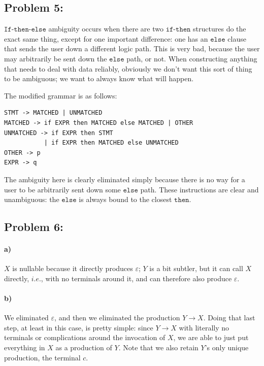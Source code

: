 \documentclass[a4paper]{article}
\begin{document}
\subsection*{Problem 5:}

$\texttt{If-then-else}$ ambiguity occurs when there are two $\texttt{if-then}$ structures do the exact same thing, except for one important difference: one has an $\texttt{else}$ clause that sends the user down a different logic path. This is very bad, because the user may arbitrarily be sent down the $\texttt{else}$ path, or not. When constructing anything that needs to deal with data reliably, obviously we don't want this sort of thing to be ambiguous; we want to always know what will happen.

The modified grammar is as follows:

\begin{verbatim}
STMT -> MATCHED | UNMATCHED
MATCHED -> if EXPR then MATCHED else MATCHED | OTHER
UNMATCHED -> if EXPR then STMT
           | if EXPR then MATCHED else UNMATCHED
OTHER -> p
EXPR -> q
\end{verbatim}

The ambiguity here is clearly eliminated simply because there is no way for a user to be arbitrarily sent down some $\texttt{else}$ path. These instructions are clear and unambiguous: the $\texttt{else}$ is always bound to the closest $\texttt{then}$.

\subsection*{Problem 6:} 

\paragraph{a)} $X$ is nullable because it directly produces $\varepsilon$; $Y$ is a bit subtler, but it can call $X$ directly, $\textit{i.e.}$, with no terminals around it, and can therefore also produce $\varepsilon$.

\paragraph{b)} We eliminated $\varepsilon$, and then we eliminated the production $Y \to X$. Doing that last step, at least in this case, is pretty simple: since $Y \to X$ with literally no terminals or complications around the invocation of $X$, we are able to just put everything in $X$ as a production of $Y$. Note that we also retain $Y$'s only unique production, the terminal $c$.
\end{document}
